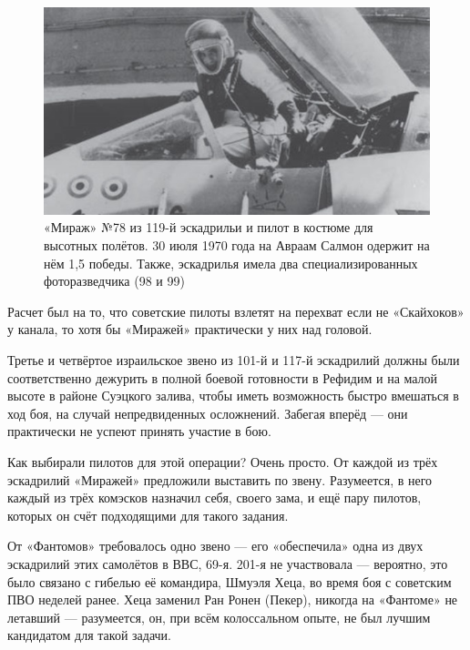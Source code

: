 \begin{figure}[h!tb] 
	\centering\includegraphics[scale=0.4]{Dolina_4/PV0i3RbdiKE.jpg}
	\caption{«Мираж» №78 из 119-й эскадрильи и пилот в костюме для высотных полётов. 30 июля 1970 года на Авраам Салмон одержит на нём 1,5 победы. Также, эскадрилья имела два специализированных фоторазведчика (98 и 99)}%
\end{figure}

Расчет был на то, что советские пилоты взлетят на перехват если не «Скайхоков» у канала, то хотя бы «Миражей» практически у них над головой.

Третье и четвёртое израильское звено из 101-й и 117-й эскадрилий должны были соответственно дежурить в полной боевой готовности в Рефидим и на малой высоте в районе Суэцкого залива, чтобы иметь возможность быстро вмешаться в ход боя, на случай непредвиденных осложнений. Забегая вперёд — они практически не успеют принять участие в бою.

Как выбирали пилотов для этой операции? Очень просто. От каждой из трёх эскадрилий «Миражей» предложили выставить по звену. Разумеется, в него каждый из трёх комэсков назначил себя, своего зама, и ещё пару пилотов, которых он счёт подходящими для такого задания.

От «Фантомов» требовалось одно звено — его «обеспечила» одна из двух эскадрилий этих самолётов в ВВС, 69-я. 201-я не участвовала — вероятно, это было связано с гибелью её командира, Шмуэля Хеца, во время боя с советским ПВО неделей ранее. Хеца заменил Ран Ронен (Пекер), никогда на «Фантоме» не летавший — разумеется, он, при всём колоссальном опыте, не был лучшим кандидатом для такой задачи.

